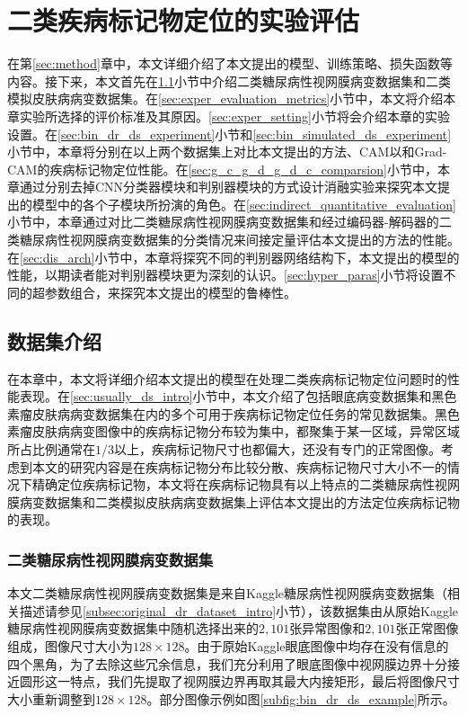 \chapter{二类疾病标记物定位的实验评估}\label{sec:experiments}
在第\ref{sec:method}章中，本文详细介绍了本文提出的模型、训练策略、损失函数等内容。接下来，本文首先在\ref{sec:exper_ds_intro}小节中介绍二类糖尿病性视网膜病变数据集和二类模拟皮肤病病变数据集。在\ref{sec:exper_evaluation_metrics}小节中，本文将介绍本章实验所选择的评价标准及其原因。\ref{sec:exper_setting}小节将会介绍本章的实验设置。在\ref{sec:bin_dr_ds_experiment}小节和\ref{sec:bin_simulated_ds_experiment}小节中，本章将分别在以上两个数据集上对比本文提出的方法、CAM以和Grad-CAM的疾病标记物定位性能。在\ref{sec:g_c_g_d_g_d_c_comparsion}小节中，本章通过分别去掉CNN分类器模块和判别器模块的方式设计消融实验来探究本文提出的模型中的各个子模块所扮演的角色。在\ref{sec:indirect_quantitative_evaluation}小节中，本章通过对比二类糖尿病性视网膜病变数据集和经过编码器-解码器的二类糖尿病性视网膜病变数据集的分类情况来间接定量评估本文提出的方法的性能。在\ref{sec:dis_arch}小节中，本章将探究不同的判别器网络结构下，本文提出的模型的性能，以期读者能对判别器模块更为深刻的认识。\ref{sec:hyper_paras}小节将设置不同的超参数组合，来探究本文提出的模型的鲁棒性。
\section{数据集介绍}\label{sec:exper_ds_intro}
在本章中，本文将详细介绍本文提出的模型在处理二类疾病标记物定位问题时的性能表现。在\ref{sec:usually_ds_intro}小节中，本文介绍了包括眼底病变数据集和黑色素瘤皮肤病病变数据集在内的多个可用于疾病标记物定位任务的常见数据集。黑色素瘤皮肤病病变图像中的疾病标记物分布较为集中，都聚集于某一区域，异常区域所占比例通常在$1/3$以上，疾病标记物尺寸也都偏大，还没有专门的正常图像。考虑到本文的研究内容是在疾病标记物分布比较分散、疾病标记物尺寸大小不一的情况下精确定位疾病标记物，本文将在疾病标记物具有以上特点的二类糖尿病性视网膜病变数据集和二类模拟皮肤病病变数据集上评估本文提出的方法定位疾病标记物的表现。
\subsection{二类糖尿病性视网膜病变数据集}\label{subsec:bin_dr_ds}
本文二类糖尿病性视网膜病变数据集是来自Kaggle糖尿病性视网膜病变数据集（相关描述请参见\ref{subsec:original_dr_dataset_intro}小节），该数据集由从原始Kaggle糖尿病性视网膜病变数据集中随机选择出来的$2,101$张异常图像和$2,101$张正常图像组成，图像尺寸大小为$128\times 128$。由于原始Kaggle眼底图像中均存在没有信息的四个黑角，为了去除这些冗余信息，我们充分利用了眼底图像中视网膜边界十分接近圆形这一特点，我们先提取了视网膜边界再取其最大内接矩形，最后将图像尺寸大小重新调整到$128\times128$。部分图像示例如图\ref{subfig:bin_dr_ds_example}所示。

